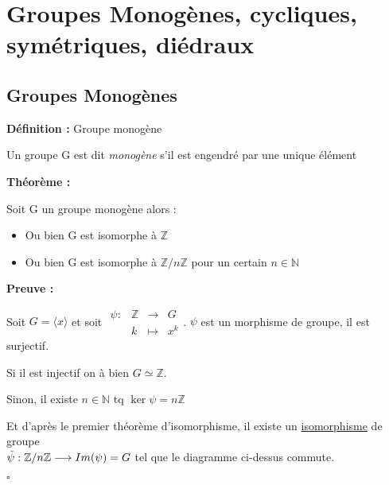 \documentclass{report}
\renewenvironment{leftbar}{%
  \def\FrameCommand{\vrule width 0.4pt \hspace{10pt}}%
  \MakeFramed {\advance\hsize-\width \FrameRestore}}%
 {\endMakeFramed}%
\newenvironment{definition}[1][]{
    \begin{tcolorbox}[colframe= white]
    \textbf{Définition :} 
    #1 \par
    }
    {\end{tcolorbox}}
\newenvironment{preuve}{\vspace*{0.5cm}
    \begin{leftbar}
    \noindent\textbf{Preuve :}\par}{
    \begin{flushright}
    $\square$
    \end{flushright}
    \end{leftbar}
}
\newenvironment{theoreme}[1][]{
    \begin{tcolorbox}[]
    \textbf{Théorème :} #1  \par} 
    {\end{tcolorbox}}
\newcommand{\fonction}[5]{
    \begin{array}{l|rcl}
    #1: & #2 & \longrightarrow & #3 \\
        & #4 & \longmapsto & #5 
    \end{array}
}
\newcommand{\N}{\mathbb{N}}
\newcommand{\Z}{\mathbb{Z}}
\newcommand{\dsp}{\displaystyle}
\begin{document}
\section{Groupes Monogènes, cycliques, symétriques, diédraux}

\subsection{Groupes Monogènes}

\begin{definition}[Groupe monogène]
Un groupe G est dit \textit{monogène} s'il est engendré par une unique élément
\end{definition}

\begin{theoreme}
Soit G un groupe monogène alors : \par
\begin{itemize}
\item Ou bien G est isomorphe à $\Z$
\item Ou bien G est isomorphe à $\Z / n\Z$ pour un certain $n \in \N$
\end{itemize}
\end{theoreme}

\begin{preuve}

\noindent Soit $G = \langle x \rangle$ et soit $\fonction{\psi}{\Z}{G}{k}{x^{k}}$. $\psi$ est un morphisme de groupe, il est surjectif. \par
\quad Si il est injectif on à bien $G\simeq \Z$. \par
Sinon, il existe $n\in \N$ tq $\ker \psi = n\Z$  \par

\begin{center}
\end{center}
Et d'après le premier théorème d'isomorphisme, il existe un \underline{isomorphisme} de groupe\\$\dsp\Tilde{\psi} : \Z/n\Z \longrightarrow Im(\psi)=G$ tel que le diagramme ci-dessus commute.

\end{preuve}
\end{document}

